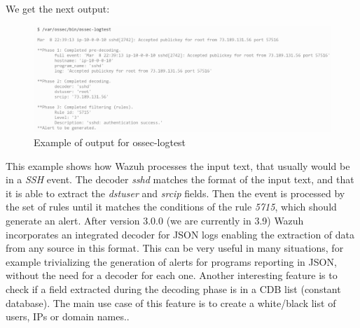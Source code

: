 \linej
We get the next output:
\begin{figure}[H]
  \centering
	\includegraphics[width=\textwidth]{figuras/ossec-logtest_output.png}
	\caption{Example of output for ossec-logtest}
\end{figure}
\linej
This example shows how Wazuh processes the input text, that usually would be in a \textit{SSH} event.
The decoder \textit{sshd} matches the format of the input text, and that it is able to extract the \textit{dstuser} and \textit{srcip} fields.
Then the event is processed by the set of rules until it matches the conditions of the rule \textit{5715}, which should generate an alert.
\linej
\linej
After version 3.0.0 (we are currently in 3.9) Wazuh incorporates an integrated decoder for JSON logs enabling the extraction of data from any source in this format. This can be very useful in many situations, for example trivializing the generation of alerts for programs reporting in JSON, without the need for a decoder for each one\cite{wazuh_json}.
\linej
\linej
Another interesting feature is to check if a field extracted during the decoding phase is in a CDB list (constant database). The main use case of this feature is to create a white/black list of users, IPs or domain names.\cite{wazuh_cdb}.
